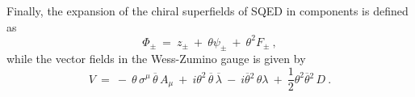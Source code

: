 \documentclass[12pt]{revtex4}
\begin{document}
Finally, the expansion of the chiral superfields of SQED in components is
defined as
\[
        \Phi_\pm ~=~ z_\pm ~+~ \theta\psi_\pm ~+~ \theta^2 F_\pm~, 
\]
while the vector fields in the Wess-Zumino gauge is given by
\[
        V ~=~  -~ \theta\,\sigma^\mu\, \overline{\theta}\, A_\mu ~+~
                i \theta^2\, \overline{\theta}\, \overline{\lambda} 
                ~-~
                i \overline{\theta}{}^2\, \theta\lambda
                ~+~
                \frac{1}{2}
                \theta^2\overline{\theta}{}^2\, D~.
\]





\end{document}
